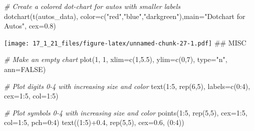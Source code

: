 \documentclass[
]{article}
\newenvironment{Shaded}{\begin{snugshade}}{\end{snugshade}}
\newcommand{\AttributeTok}[1]{\textcolor[rgb]{0.77,0.63,0.00}{#1}}
\newcommand{\CommentTok}[1]{\textcolor[rgb]{0.56,0.35,0.01}{\textit{#1}}}
\newcommand{\ConstantTok}[1]{\textcolor[rgb]{0.00,0.00,0.00}{#1}}
\newcommand{\DecValTok}[1]{\textcolor[rgb]{0.00,0.00,0.81}{#1}}
\newcommand{\FloatTok}[1]{\textcolor[rgb]{0.00,0.00,0.81}{#1}}
\newcommand{\FunctionTok}[1]{\textcolor[rgb]{0.00,0.00,0.00}{#1}}
\newcommand{\NormalTok}[1]{#1}
\newcommand{\SpecialCharTok}[1]{\textcolor[rgb]{0.00,0.00,0.00}{#1}}
\newcommand{\StringTok}[1]{\textcolor[rgb]{0.31,0.60,0.02}{#1}}
\begin{document}
\begin{Shaded}
\begin{Highlighting}[]
\CommentTok{\# Create a colored dot{-}chart for autos with smaller labels}
\FunctionTok{dotchart}\NormalTok{(}\FunctionTok{t}\NormalTok{(autos\_data), }\AttributeTok{color=}\FunctionTok{c}\NormalTok{(}\StringTok{"red"}\NormalTok{,}\StringTok{"blue"}\NormalTok{,}\StringTok{"darkgreen"}\NormalTok{),}\AttributeTok{main=}\StringTok{"Dotchart for Autos"}\NormalTok{, }\AttributeTok{cex=}\FloatTok{0.8}\NormalTok{)}
\end{Highlighting}
\end{Shaded}

\texttt{[image: 17\_1\_21\_files/figure-latex/unnamed-chunk-27-1.pdf]} \#\#
MISC

\begin{Shaded}
\begin{Highlighting}[]
\CommentTok{\# Make an empty chart}
\FunctionTok{plot}\NormalTok{(}\DecValTok{1}\NormalTok{, }\DecValTok{1}\NormalTok{, }\AttributeTok{xlim=}\FunctionTok{c}\NormalTok{(}\DecValTok{1}\NormalTok{,}\FloatTok{5.5}\NormalTok{), }\AttributeTok{ylim=}\FunctionTok{c}\NormalTok{(}\DecValTok{0}\NormalTok{,}\DecValTok{7}\NormalTok{), }\AttributeTok{type=}\StringTok{"n"}\NormalTok{, }\AttributeTok{ann=}\ConstantTok{FALSE}\NormalTok{)}

\CommentTok{\# Plot digits 0{-}4 with increasing size and color}
\FunctionTok{text}\NormalTok{(}\DecValTok{1}\SpecialCharTok{:}\DecValTok{5}\NormalTok{, }\FunctionTok{rep}\NormalTok{(}\DecValTok{6}\NormalTok{,}\DecValTok{5}\NormalTok{), }\AttributeTok{labels=}\FunctionTok{c}\NormalTok{(}\DecValTok{0}\SpecialCharTok{:}\DecValTok{4}\NormalTok{), }\AttributeTok{cex=}\DecValTok{1}\SpecialCharTok{:}\DecValTok{5}\NormalTok{, }\AttributeTok{col=}\DecValTok{1}\SpecialCharTok{:}\DecValTok{5}\NormalTok{)}

\CommentTok{\# Plot symbols 0{-}4 with increasing size and color}
\FunctionTok{points}\NormalTok{(}\DecValTok{1}\SpecialCharTok{:}\DecValTok{5}\NormalTok{, }\FunctionTok{rep}\NormalTok{(}\DecValTok{5}\NormalTok{,}\DecValTok{5}\NormalTok{), }\AttributeTok{cex=}\DecValTok{1}\SpecialCharTok{:}\DecValTok{5}\NormalTok{, }\AttributeTok{col=}\DecValTok{1}\SpecialCharTok{:}\DecValTok{5}\NormalTok{, }\AttributeTok{pch=}\DecValTok{0}\SpecialCharTok{:}\DecValTok{4}\NormalTok{)}
\FunctionTok{text}\NormalTok{((}\DecValTok{1}\SpecialCharTok{:}\DecValTok{5}\NormalTok{)}\SpecialCharTok{+}\FloatTok{0.4}\NormalTok{, }\FunctionTok{rep}\NormalTok{(}\DecValTok{5}\NormalTok{,}\DecValTok{5}\NormalTok{), }\AttributeTok{cex=}\FloatTok{0.6}\NormalTok{, (}\DecValTok{0}\SpecialCharTok{:}\DecValTok{4}\NormalTok{))}


\end{Highlighting}
\end{Shaded}
\end{document}
